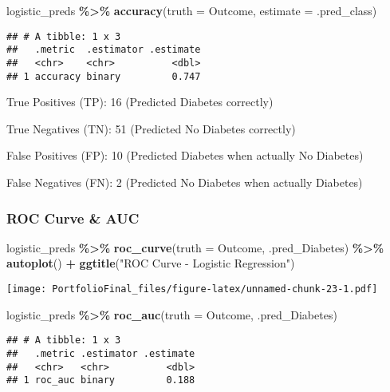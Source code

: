 \documentclass[
]{article}
\newenvironment{Shaded}{\begin{snugshade}}{\end{snugshade}}
\newcommand{\AttributeTok}[1]{\textcolor[rgb]{0.13,0.29,0.53}{#1}}
\newcommand{\FunctionTok}[1]{\textcolor[rgb]{0.13,0.29,0.53}{\textbf{#1}}}
\newcommand{\NormalTok}[1]{#1}
\newcommand{\SpecialCharTok}[1]{\textcolor[rgb]{0.81,0.36,0.00}{\textbf{#1}}}
\newcommand{\StringTok}[1]{\textcolor[rgb]{0.31,0.60,0.02}{#1}}
\begin{document}
\begin{Shaded}
\begin{Highlighting}[]
\NormalTok{logistic\_preds }\SpecialCharTok{\%\textgreater{}\%}
  \FunctionTok{accuracy}\NormalTok{(}\AttributeTok{truth =}\NormalTok{ Outcome, }\AttributeTok{estimate =}\NormalTok{ .pred\_class)}
\end{Highlighting}
\end{Shaded}

\begin{verbatim}
## # A tibble: 1 x 3
##   .metric  .estimator .estimate
##   <chr>    <chr>          <dbl>
## 1 accuracy binary         0.747
\end{verbatim}

True Positives (TP): 16 (Predicted Diabetes correctly)

True Negatives (TN): 51 (Predicted No Diabetes correctly)

False Positives (FP): 10 (Predicted Diabetes when actually No Diabetes)

False Negatives (FN): 2 (Predicted No Diabetes when actually Diabetes)

\subsubsection{ROC Curve \& AUC}\label{roc-curve-auc}

\begin{Shaded}
\begin{Highlighting}[]
\NormalTok{logistic\_preds }\SpecialCharTok{\%\textgreater{}\%}
  \FunctionTok{roc\_curve}\NormalTok{(}\AttributeTok{truth =}\NormalTok{ Outcome, .pred\_Diabetes) }\SpecialCharTok{\%\textgreater{}\%}
  \FunctionTok{autoplot}\NormalTok{() }\SpecialCharTok{+}
  \FunctionTok{ggtitle}\NormalTok{(}\StringTok{"ROC Curve {-} Logistic Regression"}\NormalTok{)}
\end{Highlighting}
\end{Shaded}

\texttt{[image: PortfolioFinal\_files/figure-latex/unnamed-chunk-23-1.pdf]}

\begin{Shaded}
\begin{Highlighting}[]
\NormalTok{logistic\_preds }\SpecialCharTok{\%\textgreater{}\%}
  \FunctionTok{roc\_auc}\NormalTok{(}\AttributeTok{truth =}\NormalTok{ Outcome, .pred\_Diabetes)}
\end{Highlighting}
\end{Shaded}

\begin{verbatim}
## # A tibble: 1 x 3
##   .metric .estimator .estimate
##   <chr>   <chr>          <dbl>
## 1 roc_auc binary         0.188
\end{verbatim}
\end{document}
